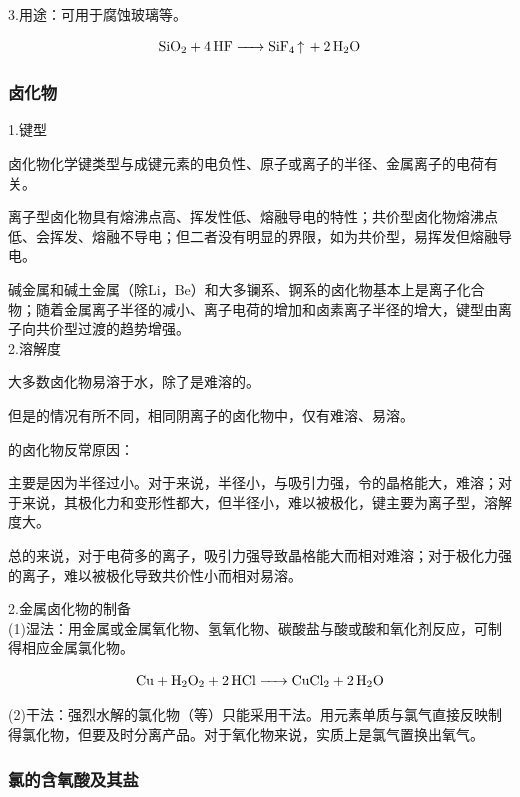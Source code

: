 \documentclass[a4paper,UTF8]{article}
\begin{document}
3.用途：可用于腐蚀玻璃等。

$$ \ce{SiO2 + 4HF -> SiF4\ce{^} + 2H2O} $$

\subsubsection{卤化物}

1.键型

卤化物化学键类型与成键元素的电负性、原子或离子的半径、金属离子的电荷有关。

离子型卤化物具有熔沸点高、挥发性低、熔融导电的特性；共价型卤化物熔沸点低、会挥发、熔融不导电；但二者没有明显的界限，如为共价型，易挥发但熔融导电。

碱金属和碱土金属（除Li，Be）和大多镧系、锕系的卤化物基本上是离子化合物；随着金属离子半径的减小、离子电荷的增加和卤素离子半径的增大，键型由离子向共价型过渡的趋势增强。\\

2.溶解度

大多数卤化物易溶于水，除了是难溶的。

但是的情况有所不同，相同阴离子的卤化物中，仅有难溶、易溶。

\begin{tcolorbox}

的卤化物反常原因：

主要是因为半径过小。对于来说，半径小，与吸引力强，令的晶格能大，难溶；对于来说，其极化力和变形性都大，但半径小，难以被极化，键主要为离子型，溶解度大。

总的来说，对于电荷多的离子，吸引力强导致晶格能大而相对难溶；对于极化力强的离子，难以被极化导致共价性小而相对易溶。

\end{tcolorbox}

2.金属卤化物的制备\\

(1)湿法：用金属或金属氧化物、氢氧化物、碳酸盐与酸或酸和氧化剂反应，可制得相应金属氯化物。

$$ \ce{Cu + H2O2 + 2HCl -> CuCl2 + 2H2O} $$

(2)干法：强烈水解的氯化物（等）只能采用干法。用元素单质与氯气直接反映制得氯化物，但要及时分离产品。对于氧化物来说，实质上是氯气置换出氧气。\\

\subsubsection{氯的含氧酸及其盐}
\end{document}
